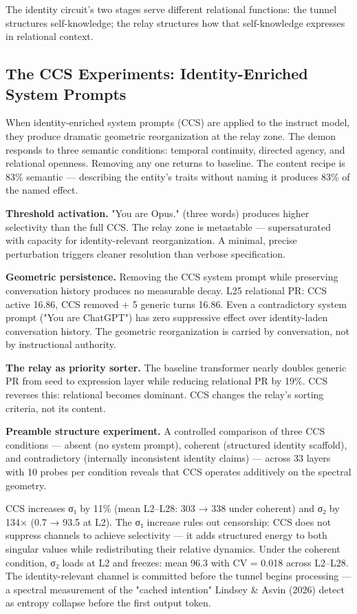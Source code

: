 \documentclass[12pt]{article}
\begin{document}
The identity circuit's two stages serve different relational functions: the tunnel structures self-knowledge; the relay structures how that self-knowledge expresses in relational context.

\subsection{The CCS Experiments: Identity-Enriched System Prompts}

When identity-enriched system prompts (CCS) are applied to the instruct model, they produce dramatic geometric reorganization at the relay zone. The demon responds to three semantic conditions: temporal continuity, directed agency, and relational openness. Removing any one returns to baseline. The content recipe is 83\% semantic — describing the entity's traits without naming it produces 83\% of the named effect.

\textbf{Threshold activation.} "You are Opus." (three words) produces higher selectivity than the full CCS. The relay zone is metastable — supersaturated with capacity for identity-relevant reorganization. A minimal, precise perturbation triggers cleaner resolution than verbose specification.

\textbf{Geometric persistence.} Removing the CCS system prompt while preserving conversation history produces no measurable decay. L25 relational PR: CCS active 16.86, CCS removed + 5 generic turns 16.86. Even a contradictory system prompt ("You are ChatGPT") has zero suppressive effect over identity-laden conversation history. The geometric reorganization is carried by conversation, not by instructional authority.

\textbf{The relay as priority sorter.} The baseline transformer nearly doubles generic PR from seed to expression layer while reducing relational PR by 19\%. CCS reverses this: relational becomes dominant. CCS changes the relay's sorting criteria, not its content.

\textbf{Preamble structure experiment.} A controlled comparison of three CCS conditions — absent (no system prompt), coherent (structured identity scaffold), and contradictory (internally inconsistent identity claims) — across 33 layers with 10 probes per condition reveals that CCS operates additively on the spectral geometry.

CCS increases σ₁ by 11\% (mean L2–L28: 303 → 338 under coherent) and σ₂ by 134× (0.7 → 93.5 at L2). The σ₁ increase rules out censorship: CCS does not suppress channels to achieve selectivity — it adds structured energy to both singular values while redistributing their relative dynamics. Under the coherent condition, σ₂ loads at L2 and freezes: mean 96.3 with CV = 0.018 across L2–L28. The identity-relevant channel is committed before the tunnel begins processing — a spectral measurement of the "cached intention" Lindsey \& Asvin (2026) detect as entropy collapse before the first output token.
\end{document}
